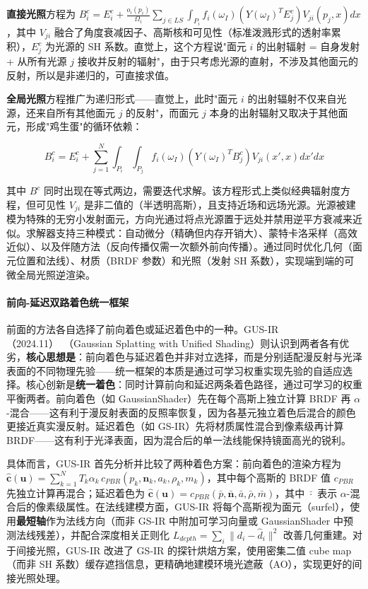 \textbf{直接光照}方程为 $B^c_i = E^c_i + \frac{o_i(p_i)}{\Omega_i} \sum_{j \in LS} \int_{P_i} f_i(\omega_I) (Y(\omega_I)^T E^c_j) V_{ji}(p_j, x) dx$，其中 $V_{ji}$ 融合了角度衰减因子、高斯核和可见性（标准泼溅形式的透射率累积），$E^c_j$ 为光源的 SH 系数。直觉上，这个方程说"面元 $i$ 的出射辐射 = 自身发射 + 从所有光源 $j$ 接收并反射的辐射"，由于只考虑光源的直射，不涉及其他面元的反射，所以是非递归的，可直接求值。

\textbf{全局光照}方程推广为递归形式——直觉上，此时"面元 $i$ 的出射辐射不仅来自光源，还来自所有其他面元 $j$ 的反射"，而面元 $j$ 本身的出射辐射又取决于其他面元，形成"鸡生蛋"的循环依赖：

\begin{equation}
B^c_i = E^c_i + \sum_{j=1}^{N} \int_{P_i} \int_{P_j} f_i(\omega_I) (Y(\omega_I)^T B^c_j) V_{ji}(x', x) dx' dx
\end{equation}

其中 $B^c$ 同时出现在等式两边，需要迭代求解。该方程形式上类似经典辐射度方程，但可见性 $V_{ji}$ 是非二值的（半透明高斯），且支持近场和远场光源。光源被建模为特殊的无穷小发射面元，方向光通过将点光源置于远处并禁用逆平方衰减来近似。求解器支持三种模式：自动微分（精确但内存开销大）、蒙特卡洛采样（高效近似）、以及伴随方法（反向传播仅需一次额外前向传播）。通过同时优化几何（面元位置和法线）、材质（BRDF 参数）和光照（发射 SH 系数），实现端到端的可微全局光照逆渲染。

\paragraph{前向-延迟双路着色统一框架}

前面的方法各自选择了前向着色或延迟着色中的一种。GUS-IR（2024.11）~\cite{2411_07478}（Gaussian Splatting with Unified Shading）则认识到两者各有优劣，\textbf{核心思想是}：前向着色与延迟着色并非对立选择，而是分别适配漫反射与光泽表面的不同物理先验——统一框架的本质是通过可学习权重实现先验的自适应选择。核心创新是\textbf{统一着色}：同时计算前向和延迟两条着色路径，通过可学习的权重平衡两者。前向着色（如 GaussianShader）先在每个高斯上独立计算 BRDF 再 $\alpha$-混合——这有利于漫反射表面的反照率恢复，因为各基元独立着色后混合的颜色更接近真实漫反射。延迟着色（如 GS-IR）先将材质属性混合到像素级再计算 BRDF——这有利于光泽表面，因为混合后的单一法线能保持镜面高光的锐利。

具体而言，GUS-IR 首先分析并比较了两种着色方案：前向着色的渲染方程为 $\hat{\mathbf{c}}(\mathbf{u}) = \sum_{k=1}^N T_k \alpha_k \, c_{PBR}(p_k, \mathbf{n}_k, a_k, \rho_k, m_k)$，其中每个高斯的 BRDF 值 $c_{PBR}$ 先独立计算再混合；延迟着色为 $\hat{\mathbf{c}}(\mathbf{u}) = c_{PBR}(\bar{p}, \bar{\mathbf{n}}, \bar{a}, \bar{\rho}, \bar{m})$，其中 $\bar{\cdot}$ 表示 $\alpha$-混合后的像素级属性。在法线建模方面，GUS-IR 将每个高斯视为面元（surfel），使用\textbf{最短轴}作为法线方向（而非 GS-IR 中附加可学习向量或 GaussianShader 中预测法线残差），并配合深度相关正则化 $L_{depth} = \sum_i \|d_i - \hat{d}_i\|^2$ 改善几何重建。对于间接光照，GUS-IR 改进了 GS-IR 的探针烘焙方案，使用密集二值 cube map（而非 SH 系数）缓存遮挡信息，更精确地建模环境光遮蔽（AO），实现更好的间接光照处理。

